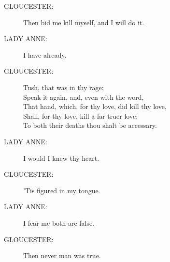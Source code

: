 \documentclass{article}
\begin{document}
\begin{description}
\item[GLOUCESTER:] 
\hspace{1pt}Then bid me kill myself, and I will do it.\\
\end{description}
\begin{description}
\item[LADY ANNE:] 
\hspace{1pt}I have already.\\
\end{description}
\begin{description}
\item[GLOUCESTER:] 
\hspace{1pt}Tush, that was in thy rage:\\
\hspace{1pt}Speak it again, and, even with the word,\\
\hspace{1pt}That hand, which, for thy love, did kill thy love,\\
\hspace{1pt}Shall, for thy love, kill a far truer love;\\
\hspace{1pt}To both their deaths thou shalt be accessary.\\
\end{description}
\begin{description}
\item[LADY ANNE:] 
\hspace{1pt}I would I knew thy heart.\\
\end{description}
\begin{description}
\item[GLOUCESTER:] 
\hspace{1pt}'Tis figured in my tongue.\\
\end{description}
\begin{description}
\item[LADY ANNE:] 
\hspace{1pt}I fear me both are false.\\
\end{description}
\begin{description}
\item[GLOUCESTER:] 
\hspace{1pt}Then never man was true.\\
\end{description}
\end{document}

